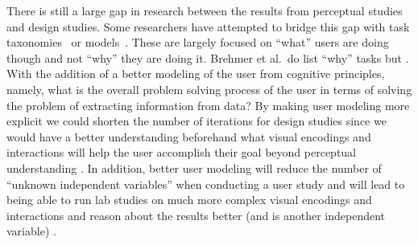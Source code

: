 There is still a large gap in research between the results from perceptual
studies and design studies. Some researchers have attempted to bridge this gap
with task taxonomies~\citep{Brehmer:2013,Shneiderman:1996} or 
models~\citep{Meyer:2012,Sacha:2014}. These are largely focused on 
``what'' users are doing though and not
``why'' they are doing it. Brehmer et al.\ do list ``why'' tasks but 
.
With the addition of
a better modeling of the user from cognitive principles, namely,
what is the overall problem solving process of the user in terms of solving the
problem of extracting information from data? By making user modeling more
explicit we could shorten the number of iterations for design studies since we
would have a better understanding beforehand what visual encodings and
interactions will help the user accomplish their goal beyond perceptual
understanding 
. 
In addition, better user modeling will reduce the number of
``unknown independent variables'' when conducting a user study and will lead to
being able to run lab studies on much more complex visual encodings and
interactions and reason about the results better (and is another independent
variable) 
.


